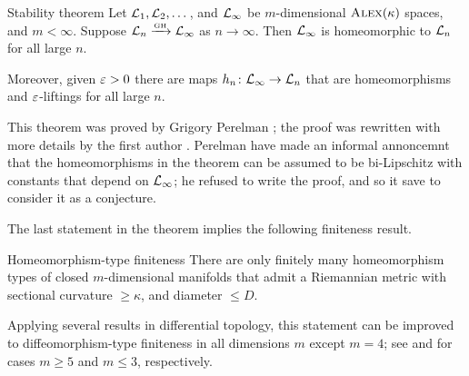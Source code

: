 \begin{thm}{Stability theorem}\label{thm:stability}
Let $\mathcal{L}_1,\mathcal{L}_2,\dots$, and $\mathcal{L}_\infty$ be  $m$-dimensional $\textsc{Alex}(\kappa)$ spaces, and $m<\infty$.
Suppose $\mathcal{L}_n\xrightarrow{\mbox{\tiny\rm GH}} \mathcal{L}_\infty$ as $n\to \infty$.
Then $\mathcal{L}_\infty$ is homeomorphic to $\mathcal{L}_n$ for all large $n$.

Moreover, given $\varepsilon>0$ there are maps $h_n\colon\mathcal{L}_\infty\to \mathcal{L}_n$ that are homeomorphisms and $\varepsilon$-liftings for all large $n$.
\end{thm}

This theorem was proved by Grigory Perelman \cite{perelman1991};
the proof was rewritten with more details by the first author \cite{kapovitch}.
Perelman have made an informal annoncemnt that the homeomorphisms in the theorem can be assumed to be bi-Lipschitz with constants that depend on $\mathcal{L}_\infty$;
he refused to write the proof, and so it save to consider it as a conjecture.

The last statement in the theorem implies the following finiteness result.

\begin{thm}{Homeomorphism-type finiteness}
There are only finitely many homeomorphism types of closed $m$-dimensional manifolds that admit a Riemannian metric with sectional curvature $\ge \kappa$, and diameter $\le D$.
\end{thm}

Applying several results in differential topology, this statement can be improved to diffeomorphism-type finiteness in all dimensions $m$ except $m=4$; see \cite{kirby-siebenmann} and  \cite{moise,thurston} for cases $m\ge 5$ and $m\le 3$, respectively.


